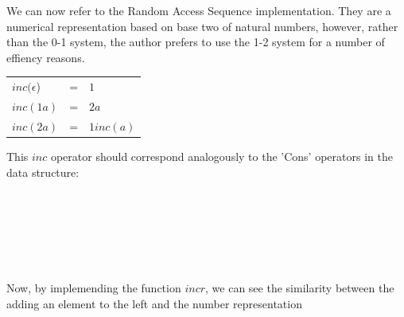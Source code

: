 \documentclass[12pt,twoside,notitlepage]{report}
\begin{document}
We can now refer to the Random Access Sequence implementation.
They are a numerical representation based on base two of natural numbers, however, rather than the 0-1 system, the author prefers to use the 1-2 system for a number of effiency reasons.

\begin{center}
	\begin{tabular}{lcl}
	$inc(\epsilon$) & = & $1$ \\
	$inc(1a)$ & = & $2a$ \\ 
	$inc(2a)$ & = & $1inc(a)$ \\
	\end{tabular} 
\end{center}

This $inc$ operator should correspond analogously to the 'Cons' operators in the data structure:

\begin{code}
\\
\>[0]\<[4]%
\>[4]  \AgdaSymbol{(} \AgdaSymbol{:}   \AgdaSymbol{)} \AgdaSymbol{(} \AgdaSymbol{:} \AgdaSymbol{)} \AgdaSymbol{:}  \<%
\\
\>[4]\<[6]%
\>[6] \AgdaSymbol{:}   \<%
\\
\>[4]\<[6]%
\>[6] \AgdaSymbol{:} \AgdaSymbol{(} \AgdaSymbol{)}  \AgdaSymbol{(} \AgdaSymbol{(} \AgdaSymbol{)} \AgdaSymbol{)}    \<%
\\
\>[4]\<[6]%
\>[6] \AgdaSymbol{:} \AgdaSymbol{(}  \AgdaSymbol{)}  \AgdaSymbol{(} \AgdaSymbol{(} \AgdaSymbol{)} \AgdaSymbol{)}    \<%
\\
\end{code}

Now, by implemending the function $incr$, we can see the similarity between the adding an element to the left and the number representation 
\end{document}
